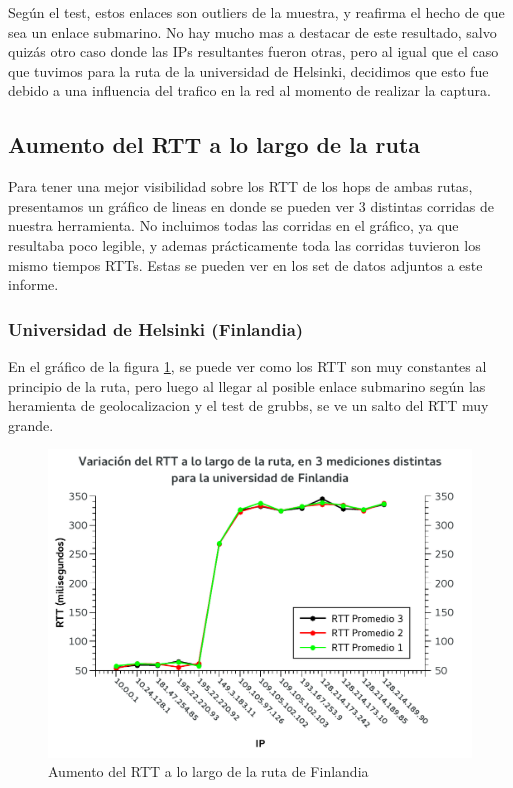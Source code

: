 Según el test, estos enlaces son outliers de la muestra, y reafirma el hecho de que sea un enlace submarino. No hay mucho mas a destacar de este resultado, salvo quizás otro caso donde las IPs resultantes fueron otras, pero al igual que el caso que tuvimos para la ruta de la universidad de Helsinki, decidimos que esto fue debido a una influencia del trafico en la red al momento de realizar la captura.


\subsection{Aumento del RTT a lo largo de la ruta}

Para tener una mejor visibilidad sobre los RTT de los hops de ambas rutas, presentamos un gráfico de lineas en donde se pueden ver 3 distintas corridas  de nuestra herramienta. No incluimos todas las corridas en el gráfico, ya que resultaba poco legible, y ademas prácticamente toda las corridas tuvieron los mismo tiempos RTTs. Estas se pueden ver en los set de datos adjuntos a este informe.

\subsubsection{Universidad de Helsinki (Finlandia)}

En el gráfico de la figura \ref{fig:rtts-finlandia}, se puede ver como los RTT son muy constantes al principio de la ruta, pero luego al llegar al posible enlace submarino según las heramienta de geolocalizacion y el test de grubbs, se ve un salto del RTT muy grande.

\begin{figure}[H]
  \begin{center}
    \includegraphics[]{graficos/finlandia-rtts.pdf}
	\caption{Aumento del RTT a lo largo de la ruta de Finlandia}
    \label{fig:rtts-finlandia}  
  \end{center}
\end{figure}

